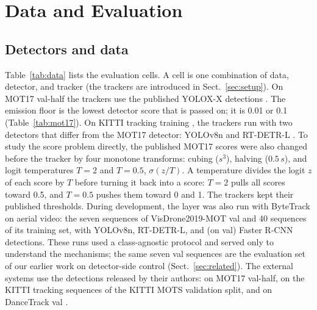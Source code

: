 \section{Data and Evaluation}\label{sec:data-eval}

\subsection{Detectors and data}\label{sec:data}
Table~\ref{tab:data} lists the evaluation cells. A cell is one combination of
data, detector, and tracker (the trackers are introduced in
Sect.~\ref{sec:setup}). On MOT17 val-half \cite{milan2016mot16} the trackers
use the published YOLOX-X detections \cite{ge2021yolox}. The emission floor is
the lowest detector score that is passed on; it is 0.01 or 0.1
(Table~\ref{tab:mot17}). On KITTI tracking training \cite{geiger2012kitti},
the trackers run with two detectors that differ from the MOT17 detector:
YOLOv8n \cite{jocher2023yolov8} and RT-DETR-L \cite{zhao2024rtdetr}. To study
the score problem directly, the published MOT17 scores were also changed
before the tracker by four monotone transforms: cubing ($s^3$), halving ($0.5\,s$),
and logit temperatures $T=2$ and $T=0.5$, $\sigma(z/T)$. A temperature
divides the logit $z$ of each score by $T$ before turning it back into a
score: $T=2$ pulls all scores toward 0.5, and $T=0.5$ pushes them toward 0
and 1. The trackers kept their published thresholds. During development,
the layer was also run with ByteTrack on aerial video: the seven sequences of
VisDrone2019-MOT val \cite{zhu2022visdrone} and 40 sequences of its training
set, with YOLOv8n, RT-DETR-L, and (on val) Faster R-CNN detections. These runs
used a class-agnostic protocol and served only to understand the mechanisms;
the same seven val sequences are the evaluation set of our earlier work on
detector-side control (Sect.~\ref{sec:related}). The external systems use the
detections released by their authors: on MOT17 val-half, on the KITTI
tracking sequences of the KITTI MOTS validation split, and on DanceTrack val
\cite{sun2022dancetrack}.



